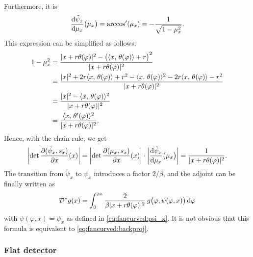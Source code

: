 \documentclass{amsart}
\renewcommand*{\phi}{\varphi}
\begin{document}
%
Furthermore, it is
%
\begin{equation*}
 \frac{\mathrm{d} \tilde\psi_x}{\mathrm{d} \mu_x}\big(\mu_x\big) = \arccos'(\mu_x) = - \frac{1}{\sqrt{1 - \mu_x^2}}.
\end{equation*}
%
This expression can be simplified as follows:
%
\begin{align*}
 1 - \mu_x^2 
 &= \frac{\ABS{x + r\theta(\phi)}^2 - \big(\INNER{x}{\theta(\phi)} + r\big)^2}{\ABS{x + r\theta(\phi)}^2} \\
 &= \frac{\ABS{x}^2 + 2r \INNER{x}{\theta(\phi)} + r^2 - \INNER{x}{\theta(\phi)}^2 - 2r\INNER{x}{\theta(\phi)} - r^2}{\ABS{x + 
 r\theta(\phi)}^2} \\
 &= \frac{\ABS{x}^2 - \INNER{x}{\theta(\phi)}^2}{\ABS{x + r\theta(\phi)}^2} \\
 &= \frac{\INNER{x}{\theta'(\phi)}^2}{\ABS{x + r\theta(\phi)}^2}.
\end{align*}
%
Hence, with the chain rule, we get
%
\begin{equation*}
 \ABSLR{\DET \frac{\partial(\tilde\psi_x, s_x)}{\partial x} (x)} = \ABSLR{\DET \frac{\partial(\mu_x, s_x)}{\partial x} (x)} \cdot
 \ABSLR{\frac{\D \tilde\psi_x}{\D \mu_x}\big(\mu_x\big)} = \frac{1}{\ABS{x + r\theta(\phi)}^2}.
\end{equation*}
%
The transition from $\tilde\psi_x$ to $\psi_x$ introduces a factor $2/\beta$, and the adjoint can be finally written as
%
\begin{equation}
 \label{eq:fancurved:backproj_alt}
 \OPD^* g(x) = \int_0^{\phi_0} \frac{2}{\beta \ABS{x + r\theta(\phi)}^2}\, g\big(\phi, \psi(\phi, x)\big)\, \D \phi
\end{equation}
%
with $\psi(\phi, x) = \psi_x$ as defined in \eqref{eq:fancurved:psi_x}. It is not obvious that this formula is equivalent to 
\eqref{eq:fancurved:backproj}.
\vspace{5ex}%



\subsubsection{Flat detector}
\label{sec:applications:fanbeam:flat}
\end{document}
